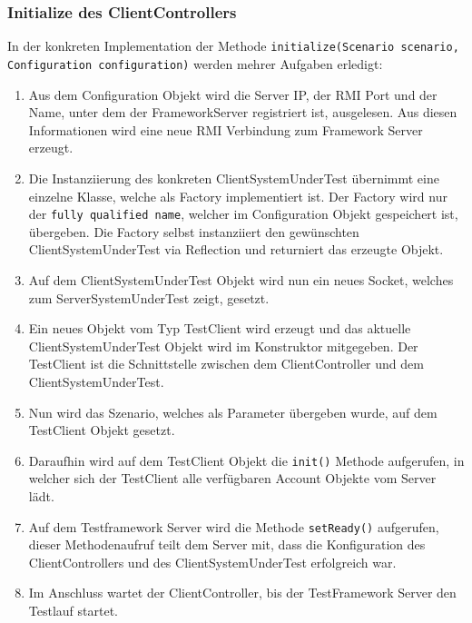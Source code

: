 \subsubsection{Initialize des ClientControllers}
In der konkreten Im\-p\-le\-men\-ta\-ti\-on der Me\-tho\-de \texttt{initialize(Scenario sce\allowbreak na\allowbreak rio, Configuration configuration)} werden mehrer Auf\-gaben er\-le\-digt:
\begin{enumerate}
\item Aus dem Configuration Objekt wird die Server IP, der RMI Port und der Name, unter dem der FrameworkServer registriert ist, ausgelesen. Aus diesen Informationen wird eine neue RMI Verbindung zum Framework Server erzeugt.
\item Die Instanziierung des konkreten ClientSystemUnderTest übernimmt eine einzelne Klasse, welche als Factory implementiert ist. Der Factory wird nur der \verb+fully qualified name+, welcher im Configuration Objekt gespeichert ist, übergeben. Die Factory selbst instanziiert den ge\-wünschten Client\-System\-Under\-Test via Re\-flec\-ti\-on und re\-turniert das erzeugte Objekt.
\item Auf dem ClientSystemUnderTest Objekt wird nun ein neues Socket, welches zum ServerSystemUnderTest zeigt, gesetzt.
\item Ein neues Objekt vom Typ TestClient wird erzeugt und das aktuelle ClientSystemUnderTest Objekt wird im Konstruktor mitgegeben. Der TestClient ist die Schnittstelle zwischen dem ClientController und dem ClientSystemUnderTest.
\item Nun wird das Szenario, welches als Parameter übergeben wurde, auf dem TestClient Objekt gesetzt. 
\item Daraufhin wird auf dem Test\-Client Objekt die \verb+init()+ Methode auf\-ge\-rufen, in welcher sich der TestClient alle verfügbaren Account Objekte vom Server lädt.
\item Auf dem Testframework Server wird die Me\-tho\-de \verb+setReady()+ auf\-ge\-rufen, dieser Methoden\-aufruf teilt dem Server mit, dass die Konfiguration des ClientControllers und des ClientSystemUnderTest erfolgreich war.
\item Im Anschluss wartet der ClientController, bis der TestFramework Server den Testlauf startet.
\end{enumerate}

